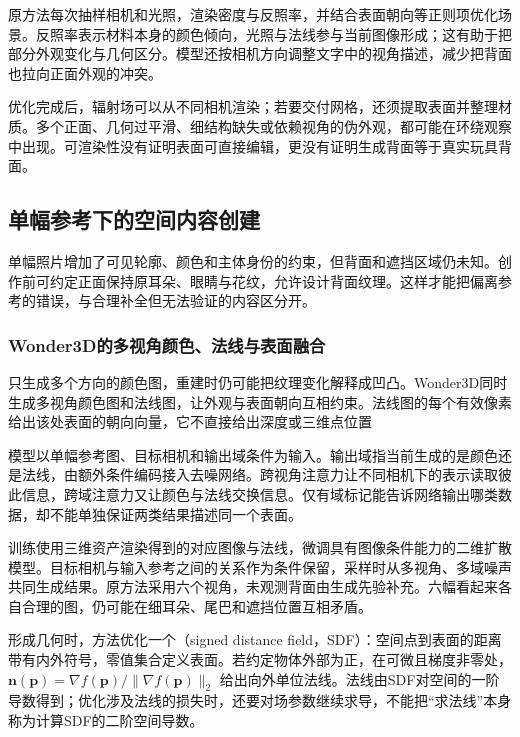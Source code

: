 原方法每次抽样相机和光照，渲染密度与反照率，并结合表面朝向等正则项优化场景。反照率表示材料本身的颜色倾向，光照与法线参与当前图像形成；这有助于把部分外观变化与几何区分。模型还按相机方向调整文字中的视角描述，减少把背面也拉向正面外观的冲突。

优化完成后，辐射场可以从不同相机渲染；若要交付网格，还须提取表面并整理材质。多个正面、几何过平滑、细结构缺失或依赖视角的伪外观，都可能在环绕观察中出现。可渲染性没有证明表面可直接编辑，更没有证明生成背面等于真实玩具背面。

\subsection{单幅参考下的空间内容创建}
\label{sec:vision-multigen-single-reference}

单幅照片增加了可见轮廓、颜色和主体身份的约束，但背面和遮挡区域仍未知。创作前可约定正面保持原耳朵、眼睛与花纹，允许设计背面纹理。这样才能把偏离参考的错误，与合理补全但无法验证的内容区分开。

\subsubsection{Wonder3D的多视角颜色、法线与表面融合}
\label{sec:vision-multigen-wonder3d}

只生成多个方向的颜色图，重建时仍可能把纹理变化解释成凹凸。Wonder3D同时生成多视角颜色图和法线图，让外观与表面朝向互相约束。法线图的每个有效像素给出该处表面的朝向向量，它不直接给出深度或三维点位置

模型以单幅参考图、目标相机和输出域条件为输入。输出域指当前生成的是颜色还是法线，由额外条件编码接入去噪网络。跨视角注意力让不同相机下的表示读取彼此信息，跨域注意力又让颜色与法线交换信息。仅有域标记能告诉网络输出哪类数据，却不能单独保证两类结果描述同一个表面。

训练使用三维资产渲染得到的对应图像与法线，微调具有图像条件能力的二维扩散模型。目标相机与输入参考之间的关系作为条件保留，采样时从多视角、多域噪声共同生成结果。原方法采用六个视角，未观测背面由生成先验补充。六幅看起来各自合理的图，仍可能在细耳朵、尾巴和遮挡位置互相矛盾。

形成几何时，方法优化一个（signed distance field，SDF）：空间点到表面的距离带有内外符号，零值集合定义表面。若约定物体外部为正，在可微且梯度非零处，
$\bm n(\bm p)=\nabla f(\bm p)/\|\nabla f(\bm p)\|_2$
给出向外单位法线。法线由SDF对空间的一阶导数得到；优化涉及法线的损失时，还要对场参数继续求导，不能把“求法线”本身称为计算SDF的二阶空间导数。

